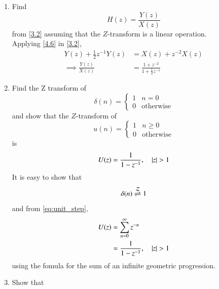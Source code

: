 \documentclass[journal,12pt,twocolumn]{IEEEtran}
\renewcommand\thesection{\arabic{section}}
\begin{document}
\begin{enumerate}[label=\thesection.\arabic*
,ref=\thesection.\theenumi]
	\begin{align}
	\mathcal{Z}\cbrak{x(n-k)} &= z^{-k}(1+2 z^{-1}+3 z^{-2} +\\&\hspace*{10mm} 4 z^{-3} + 2 z^{-4} + z^{-5})\\
	\mathcal{Z}\cbrak{x(n-k)} &= z^{-k}+2 z^{-(k+1)}+3 z^{-(k+2)} \\&+ 4 z^{-(k+3)} + 2 z^{-(k+4)} + z^{-(k+5)}
	\end{align}
\item Find
%
\begin{equation}\label{4.7}
H(z) = \frac{Y(z)}{X(z)}
\end{equation}
%
from  \eqref{3.2} assuming that the $Z$-transform is a linear operation.
\\
\solution  Applying \eqref{4.6} in \eqref{3.2},
\begin{align}\label{4.9}
Y(z) + \frac{1}{2}z^{-1}Y(z) &= X(z)+z^{-2}X(z)
\\
\implies \frac{Y(z)}{X(z)} &= \frac{1 + z^{-2}}{1 + \frac{1}{2}z^{-1}}
\label{eq:freq_resp}
\end{align}
%
\item Find the Z transform of 
\begin{equation}
\delta(n)
=
\begin{cases}
1 & n = 0
\\
0 & \text{otherwise}
\end{cases}
\end{equation}
and show that the $Z$-transform of
\begin{equation}
\label{eq:unit_step}
u(n)
=
\begin{cases}
1 & n \ge 0
\\
0 & \text{otherwise}
\end{cases}
\end{equation}
is
\begin{equation}
U(z) = \frac{1}{1-z^{-1}}, \quad \left\vert z\right\vert > 1
\end{equation}
\solution It is easy to show that
\begin{equation}
\delta(n) \overset{\mathcal{Z}}{ \rightleftharpoons} 1
\end{equation}
and from \eqref{eq:unit_step},
\begin{align}
U(z) &= \sum _{n= 0}^{\infty}z^{-n}
\\
&=\frac{1}{1-z^{-1}}, \quad \left\vert z\right\vert > 1
\end{align}
using the fomula for the sum of an infinite geometric progression.
%
\item Show that 
\begin{equation}

\end{equation}
\end{enumerate}
\end{document}
